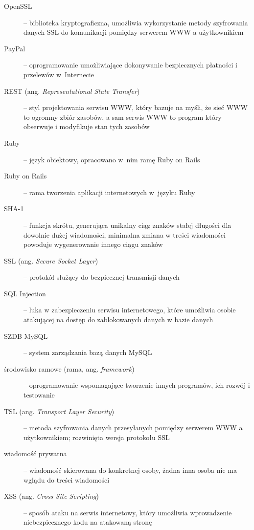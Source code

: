 \documentclass[12pt,leqno,twoside]{mwart}
\begin{document}
\begin{description}
\item[OpenSSL]-- biblioteka kryptograficzna, umożliwia wykorzystanie metody szyfrowania danych SSL do komunikacji pomiędzy serwerem WWW a użytkownikiem\\
\item[PayPal]-- oprogramowanie umożliwiające dokonywanie bezpiecznych płatności i przelewów w~Internecie\\
\item[REST (ang. \textit{Representational State Transfer})]-- styl projektowania serwisu WWW, który bazuje na myśli, że sieć WWW to ogromny zbiór zasobów, a sam serwis WWW to program który obserwuje i modyfikuje stan tych zasobów\\
\item[Ruby]-- język obiektowy, opracowano w~nim ramę Ruby on Rails\\
\item[Ruby on Rails]-- rama tworzenia aplikacji internetowych w~języku Ruby\\
\item[SHA-1]-- funkcja skrótu, generująca unikalny ciąg znaków stałej długości dla dowolnie dużej wiadomości, minimalna zmiana w treści wiadomości powoduje wygenerowanie innego ciągu znaków\\
\item[SSL (ang. \textit{Secure Socket Layer})]-- protokół służący do bezpiecznej transmisji danych\\
\item[SQL Injection]-- luka w zabezpieczeniu serwisu internetowego, które umożliwia osobie atakującej na dostęp do zablokowanych danych w bazie danych\\
\item[SZDB MySQL]-- system zarządzania bazą danych MySQL\\
\item[środowisko ramowe (rama, ang. \textit{framework})]-- oprogramowanie wspomagające tworzenie innych programów, ich rozwój i testowanie\\
\item[TSL (ang. \textit{Transport Layer Security})]-- metoda szyfrowania danych przesyłanych pomiędzy serwerem WWW a użytkownikiem; rozwinięta wersja protokołu SSL\\
\item[wiadomość prywatna]-- wiadomość skierowana do konkretnej osoby, żadna inna osoba nie ma wglądu do treści wiadomości\\
\item[XSS (ang. \textit{Cross-Site Scripting})]-- sposób ataku na serwis internetowy, który umożliwia wprowadzenie niebezpiecznego kodu na atakowaną stronę\\
\end{description}
\end{document}
